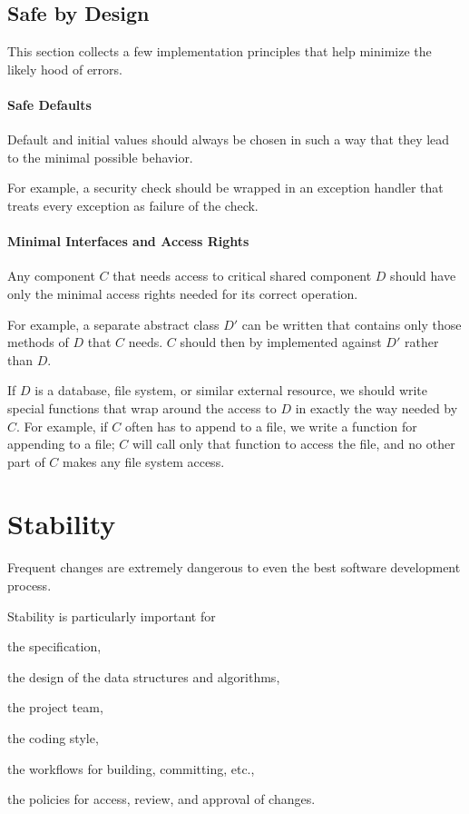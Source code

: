 \subsection{Safe by Design}

This section collects a few implementation principles that help minimize the likely hood of errors.

\paragraph{Safe Defaults}
Default and initial values should always be chosen in such a way that they lead to the minimal possible behavior.

For example, a security check should be wrapped in an exception handler that treats every exception as failure of the check.

\paragraph{Minimal Interfaces and Access Rights}
Any component $C$ that needs access to critical shared component $D$ should have only the minimal access rights needed for its correct operation.

For example, a separate abstract class $D'$ can be written that contains only those methods of $D$ that $C$ needs.
$C$ should then by implemented against $D'$ rather than $D$.

If $D$ is a database, file system, or similar external resource, we should write special functions that wrap around the access to $D$ in exactly the way needed by $C$.
For example, if $C$ often has to append to a file, we write a function for appending to a file;
$C$ will call only that function to access the file, and no other part of $C$ makes any file system access.

\section{Stability}

Frequent changes are extremely dangerous to even the best software development process.

Stability is particularly important for
\begin{compactitem}
  \item the specification,
  \item the design of the data structures and algorithms,
  \item the project team,
  \item the coding style,
  \item the workflows for building, committing, etc.,
  \item the policies for access, review, and approval of changes.
\end{compactitem}

